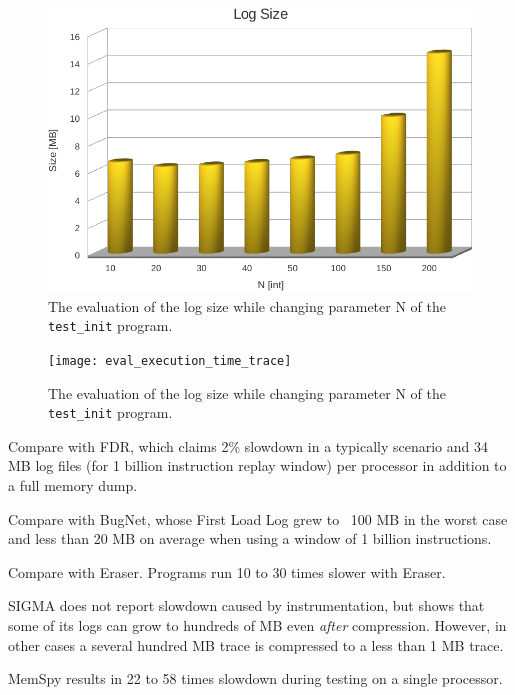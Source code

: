 \begin{figure}
  \includegraphics[width=\columnwidth]{eval_log_size}
  \caption{The evaluation of the log size while changing parameter N of the \texttt{test\_init} program. }
  \label{fig:eval_log_size}
\end{figure}

\begin{figure}
  \texttt{[image: eval\_execution\_time\_trace]}
  \caption{The evaluation of the log size while changing parameter N of the \texttt{test\_init} program. }
  \label{fig:eval_execution_time_trace}
\end{figure}

Compare with FDR, which claims 2\% slowdown in a typically scenario
and 34 MB log files (for 1 billion instruction replay window)
per processor in addition to a full memory dump.

Compare with BugNet, whose First Load Log grew to ~100 MB in the worst
case and less than 20 MB on average when using a window of 1
billion instructions.

Compare with Eraser.  Programs run 10 to 30 times slower with Eraser.

SIGMA does not report slowdown caused by instrumentation, but shows
that some of its logs can grow to hundreds of MB even \emph{after} compression.
However, in other cases a several hundred MB trace is compressed
to a less than 1 MB trace.

MemSpy results in 22 to 58 times slowdown during testing on a single processor.

